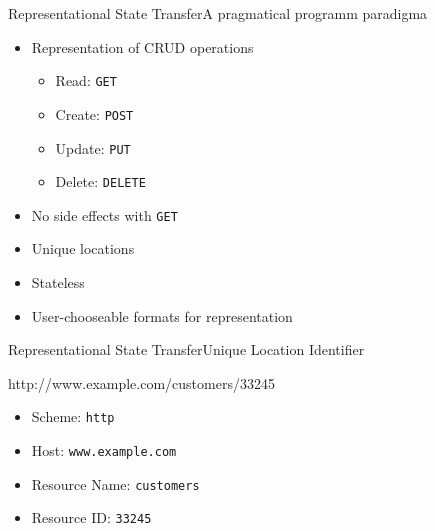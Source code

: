 \begin{frame}{Representational State Transfer}{A pragmatical programm paradigma}
    \begin{itemize}
        \pause
        \item Representation of CRUD operations
        \pause
        \begin{itemize}
            \item Read: \texttt{GET}
            \pause
            \item Create: \texttt{POST}
            \pause
            \item Update: \texttt{PUT}
            \pause
            \item Delete: \texttt{DELETE}
            \pause
        \end{itemize}
        \item No side effects with \texttt{GET}
        \pause
        \item Unique locations
        \pause
        \item Stateless
        \pause
        \item User-chooseable formats for representation
    \end{itemize}
\end{frame}


\begin{frame}{Representational State Transfer}{Unique Location Identifier}

\begin{center}

\pause

\large http://www.example.com/customers/33245

\end{center}

\pause
        \begin{itemize}
            \item Scheme: \texttt{http}
            \pause
            \item Host: \texttt{www.example.com}
            \pause
            \item Resource Name: \texttt{customers}
            \pause
            \item Resource ID: \texttt{33245}
        \end{itemize}



\end{frame}

